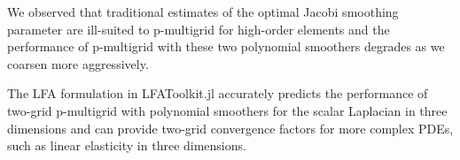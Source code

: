 \documentclass[review]{siamart190516}
\begin{document}
We observed that traditional estimates of the optimal Jacobi smoothing parameter are ill-suited to p-multigrid for high-order elements and the performance of p-multigrid with these two polynomial smoothers degrades as we coarsen more aggressively.

The LFA formulation in LFAToolkit.jl accurately predicts the performance of two-grid p-multigrid with polynomial smoothers for the scalar Laplacian in three dimensions and can provide two-grid convergence factors for more complex PDEs, such as linear elasticity in three dimensions.



\end{document}
